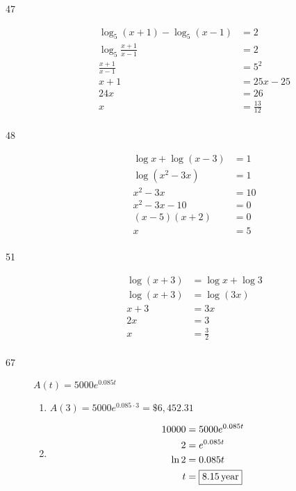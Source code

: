 \documentclass{exam}
\begin{document}
\begin{description}
      \item[47] 
        \begin{align*}
          \log_5 (x + 1) - \log_5 (x - 1) &= 2 \\
          \log_5 \frac{x + 1}{x - 1}      &= 2 \\
          \frac{x + 1}{x - 1}             &= 5^2 \\
          x + 1                           &= 25x - 25 \\
          24x                             &= 26 \\
          x                               &= \boxed{\frac{13}{12}} \\
        \end{align*}

      \item[48] 
        \begin{align*}
          \log x + \log (x - 3)        &= 1 \\
          \log \left( x^2 - 3x \right) &= 1 \\
          x^2 - 3x                     &= 10 \\
          x^2 - 3x - 10                &= 0 \\
          (x - 5)(x + 2)               &= 0 \\
          x                            &= \boxed{5} \\
        \end{align*}

      \item[51] 
        \begin{align*}
          \log (x + 3) &= \log x + \log 3 \\
          \log (x + 3) &= \log (3x) \\
           x + 3       &= 3x \\
           2x          &= 3 \\
           x           &= \boxed{\frac{3}{2}} \\
        \end{align*}

      \item[67]
        $A(t) = 5000 e^{0.085 t}$

        \begin{enumerate}[a]
          \item $A(3) = 5000 e^{0.085 \cdot 3} = \boxed{\$6,452.31}$

          \item
            \begin{align*}
              10000 &= 5000 e^{0.085 t} \\
              2     &= e^{0.085 t} \\
              \ln 2 &= 0.085t \\
              t     &= \boxed{\unit[8.15]{year}} \\
            \end{align*}
        \end{enumerate}


\end{description}
\end{document}
